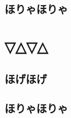\documentclass[a4paper, 12pt]{ltjreport}
\begin{document}
\section{ほりゃほりゃ}
\chapter{▽△▽△}
\section{ほげほげ}
\section{ほりゃほりゃ}


\end{document}
